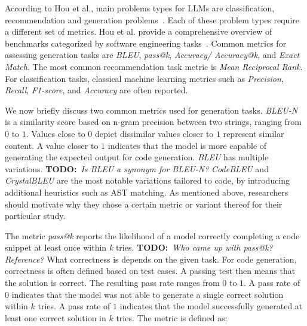 \documentclass[11pt]{article}
\newcommand{\todo}[1]{{\textbf{TODO:}\ \textit{#1}}} %
\begin{document}
According to Hou et al., main problems types for LLMs are classification, recommendation and generation problems~\cite{10.1145/3695988}.
Each of these problem types require a different set of metrics.
 Hou et al. provide a comprehensive overview of benchmarks categorized by software engineering tasks~\cite{10.1145/3695988}.
Common metrics for assessing generation tasks are \emph{BLEU}, \emph{pass@k}, \emph{Accuracy/ Accuracy@k}, and \emph{Exact Match}.
The most common recommendation task metric is \emph{Mean Reciprocal Rank}.
For classification tasks, classical machine learning metrics such as \emph{Precision}, \emph{Recall}, \emph{F1-score}, and \emph{Accuracy} are often reported.

We now briefly discuss two common metrics used for generation tasks.
\emph{BLEU-N} \cite{DBLP:conf/acl/PapineniRWZ02} is a similarity score based on n-gram precision between two strings, ranging from $0$ to $1$.
Values close to $0$ depict dissimilar values closer to $1$ represent similar content.
A value closer to $1$ indicates that the model is more capable of generating the expected output for code generation.
\emph{BLEU} has multiple variations.
\todo{Is BLEU a synonym for BLEU-N?}
\emph{CodeBLEU} \cite{DBLP:journals/corr/abs-2009-10297} and \emph{CrystalBLEU} \cite{DBLP:conf/kbse/EghbaliP22} are the most notable variations tailored to code, by introducing additional heuristics such as AST matching.
As mentioned above, researchers should motivate why they chose a certain metric or variant thereof for their particular study.

The metric \emph{pass@k} reports the likelihood of a model correctly completing a code snippet at least once within \emph{k} tries.
\todo{Who came up with pass@k? Reference?}
What correctness is depends on the given task.
For code generation, correctness is often defined based on test cases. A passing test then means that the solution is correct.
The resulting pass rate ranges from $0$ to $1$.
A pass rate of $0$ indicates that the model was not able to generate a single correct solution within $k$ tries.
A pass rate of $1$ indicates that the model successfully generated at least one correct solution in $k$ tries.
The metric is defined as:
\end{document}
